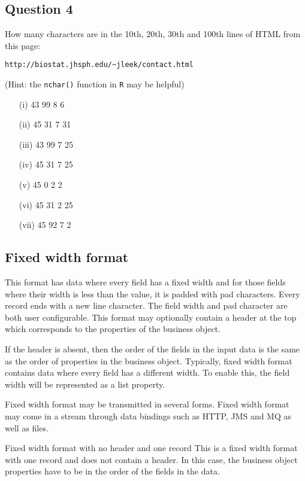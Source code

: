 \documentclass[12pt]{article}
\begin{document}
\subsection*{Question 4}
How many characters are in the 10th, 20th, 30th and 100th lines of HTML from this page: 
\begin{verbatim}
http://biostat.jhsph.edu/~jleek/contact.html 
\end{verbatim}
(Hint: the \texttt{nchar()} function in \texttt{R} may be helpful)
\begin{itemize}
\item[(i)] 43 99 8 6
\item[(ii)] 45 31 7 31
\item[(iii)] 43 99 7 25
\item[(iv)] 45 31 7 25
\item[(v)] 45 0 2 2
\item[(vi)] 45 31 2 25
\item[(vii)] 45 92 7 2
\end{itemize}

\newpage
\subsection*{Fixed width format}

This format has data where every field has a fixed width and for those fields where their width is less than the value, it is padded with pad characters. Every record ends with a new line character. The field width and pad character are both user configurable. This format may optionally contain a header at the top which corresponds to the properties of the business object. 

If the header is absent, then the order of the fields in the input data is the same as the order of properties in the business object. Typically, fixed width format contains data where every field has a different width. To enable this, the field width will be represented as a list property.

Fixed width format may be transmitted in several forms. Fixed width format may come in a stream through data bindings such as HTTP, JMS and MQ as well as files.

Fixed width format with no header and one record
This is a fixed width format with one record and does not contain a header. In this case, the business object properties have to be in the order of the fields in the data.
\end{document}
